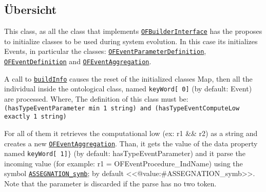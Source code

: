 \subsection{Übersicht}
This class, as all the class that implements \texttt{\hyperlink{ontologyFramework.OFRunning.OFInitialising.OFBuilderInterface<T>-class}{OFBuilderInterface}} has the proposes to initialize
 classes to be used during system evolution. In this case its initializes Events,
 in particular the classes: \texttt{\hyperlink{ontologyFramework.OFEventManagement.OFEventParameterDefinition-class}{OFEventParameterDefinition}}, \texttt{\hyperlink{ontologyFramework.OFEventManagement.OFLogicalEventManagement.OFEventDefinition-class}{OFEventDefinition}} and \texttt{\hyperlink{ontologyFramework.OFEventManagement.OFLogicalEventManagement.OFEventAggregation-class}{OFEventAggregation}}. 
 \par 
 A call to \texttt{\hyperlink{ontologyFramework.OFEventManagement.OFLogicalEventManagement.OFEventBuilder.buildInfo(java.lang.String[],ontologyFramework.OFContextManagement.OWLReferences,ontologyFramework.OFRunning.OFInvokingManager.OFBuildedListInvoker)}{buildInfo}} causes the reset of the
 initialized classes Map, then all the individual inside the ontological class, named \verb!keyWord[ 0]!
 (by default: \textquotedbl Event\textquotedbl ) are processed. Where, The definition of this class must be:
 	\verb!(hasTypeEventParameter min 1 string) and (hasTypeEventComputeLow exactly 1 string)! 
 \par 
 For all of them it retrieves the computational low (ex: \textquotedbl r1 \&\& r2\textquotedbl ) as a string and creates a 
 new \texttt{\hyperlink{ontologyFramework.OFEventManagement.OFLogicalEventManagement.OFEventAggregation-class}{OFEventAggregation}}. Than, it gets the value of the data property 
 named \verb!keyWord[ 1]!$\}$ (by default: \textquotedbl hasTypeEventParameter\textquotedbl ) and 
 it parse the incoming value (for example: \textquotedbl r1 = OFEventProcedure\_IndName\textquotedbl ) using the symbol 
 \texttt{\hyperlink{ontologyFramework.OFEventManagement.OFLogicalEventManagement.OFEventBuilder.ASSEGNATION_symb}{ASSEGNATION_symb}}; by default <<@value:#ASSEGNATION_symb>>. 
 Note that the parameter is discarded if the parse has no two token. 
